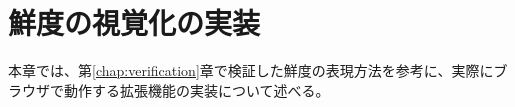 \chapter{鮮度の視覚化の実装}
\label{chap:implementation}

本章では、第\ref{chap:verification}章で検証した鮮度の表現方法を参考に、実際にブラウザで動作する拡張機能の実装について述べる。


